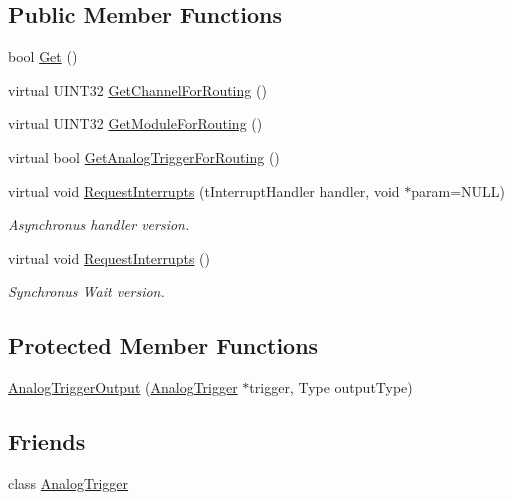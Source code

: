 \subsection*{Public Member Functions}
\begin{DoxyCompactItemize}
\item 
bool \hyperlink{classAnalogTriggerOutput_a932c64e6e662803108a6a951b3809ad0}{Get} ()
\item 
virtual UINT32 \hyperlink{classAnalogTriggerOutput_a5a3c5233ce579ae4d84098f08abd808a}{GetChannelForRouting} ()
\item 
virtual UINT32 \hyperlink{classAnalogTriggerOutput_ae1805118b5d82d7937aadd438df949b8}{GetModuleForRouting} ()
\item 
virtual bool \hyperlink{classAnalogTriggerOutput_a719c7a65061492d2378f3d5bef2e0275}{GetAnalogTriggerForRouting} ()
\item 
virtual void \hyperlink{classAnalogTriggerOutput_a36ef5c0664731e05e14cc9fad673a0f4}{RequestInterrupts} (tInterruptHandler handler, void $\ast$param=NULL)
\begin{DoxyCompactList}\small\item\em Asynchronus handler version. \end{DoxyCompactList}\item 
virtual void \hyperlink{classAnalogTriggerOutput_a0630898833f66fcd671e7bb4561e4d81}{RequestInterrupts} ()
\begin{DoxyCompactList}\small\item\em Synchronus Wait version. \end{DoxyCompactList}\end{DoxyCompactItemize}
\subsection*{Protected Member Functions}
\begin{DoxyCompactItemize}
\item 
\hyperlink{classAnalogTriggerOutput_a1eabb0bac38ac9c3ec1ca6a2ab3050f9}{AnalogTriggerOutput} (\hyperlink{classAnalogTrigger}{AnalogTrigger} $\ast$trigger, Type outputType)
\end{DoxyCompactItemize}
\subsection*{Friends}
\begin{DoxyCompactItemize}
\item 
\hypertarget{classAnalogTriggerOutput_aaae5addbdfb60c5f834f1cd08e59dadd}{
class \hyperlink{classAnalogTriggerOutput_aaae5addbdfb60c5f834f1cd08e59dadd}{AnalogTrigger}}
\label{classAnalogTriggerOutput_aaae5addbdfb60c5f834f1cd08e59dadd}

\end{DoxyCompactItemize}


